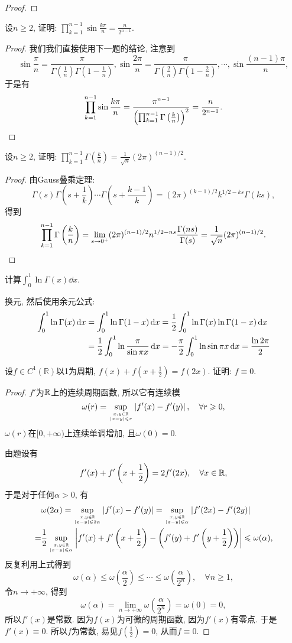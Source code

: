 \begin{quiza}
\begin{proof}
\end{proof}
\woe 设\(n\geqslant 2\), 证明: \(\prod_{k=1}^{n-1}\sin\frac{k\pi}{n}=\frac{n}{2^{n-1}}\).
\begin{proof}
我们我们直接使用下一题的结论, 注意到\[\sin\frac{\pi}{n}=\frac{\pi}{\Gamma\left(\frac{1}{n}\right)\Gamma\left(1-\frac{1}{n}\right)},\sin\frac{2\pi}{n}=\frac{\pi}{\Gamma\left(\frac{2}{n}\right)\Gamma\left(1-\frac{2}{n}\right)},\cdots,\sin\frac{(n-1)\pi}{n},\]于是有\[\prod_{k=1}^{n-1}\sin\frac{k\pi}{n}=\frac{\pi^{n-1}}{\left(\prod_{k=1}^{n-1}\Gamma\left(\frac{k}{n}\right)\right)^2}=\frac{n}{2^{n-1}}.\qedhere\]
\end{proof}
\woe 设\(n\geqslant 2\), 证明: \(\prod_{k=1}^{n-1}\Gamma\left(\frac{k}{n}\right)=\frac{1}{\sqrt{n}}(2\pi)^{(n-1)/2}.\)
\begin{proof}
由Gauss叠乘定理: \[\Gamma(s)\Gamma\left(s+\frac{1}{k}\right)\cdots\Gamma\left(s+\frac{k-1}{k}\right)=\left(2\pi\right)^{(k-1)/2}k^{1/2-ks}\Gamma(ks),\]得到\[\prod_{k=1}^{n-1}\Gamma\left(\frac{k}{n}\right)=\lim_{s\rightarrow 0^+}(2\pi)^{(n-1)/2}n^{1/2-ns}\frac{\Gamma(ns)}{\Gamma(s)}=\frac{1}{\sqrt{n}}(2\pi)^{(n-1)/2}.\qedhere\]
\end{proof}
\woe 计算\(\int_{0}^{1}\ln\Gamma(x)\dd x.\)
\begin{solution}
换元, 然后使用余元公式:\[\begin{split}
\int_{0}^{1}\ln\Gamma(x)\,\mathrm{d} x&=\int_{0}^{1}\ln\Gamma(1-x)\,\mathrm{d} x=\frac{1}{2}\int_{0}^{1}\ln\Gamma(x)\ln\Gamma(1-x)\,\mathrm{d} x\\&=\frac{1}{2}\int_{0}^{1}\ln\frac{\pi}{\sin\pi x}\,\mathrm{d} x=-\frac{\pi}{2}\int_{0}^{1}\ln\sin\pi x\,\mathrm{d} x=\frac{\ln2\pi}{2}\qedhere
\end{split}\]
\end{solution}
\woe 设\(f\in C^1(\mathbb{R})\)以1为周期, \(f(x)+f\left(x+\frac{1}{2}\right)=f(2x)\). 证明: \(f\equiv 0\).
\begin{proof}
\(f'\)为\(\mathbb{R}\)上的连续周期函数, 所以它有连续模\[\omega(r)=\sup_{x,y\in\mathbb{R} \atop |x-y|\leqslant r}\left|f'(x)-f'(y)\right|,\quad \forall r\geqslant 0,\]\(\omega(r)\)在\([0,+\infty)\)上连续单调增加, 且\(\omega(0)=0\).

由题设有\[f'(x)+f'\left(x+\frac{1}{2}\right)=2f'(2x),\quad\forall x\in\mathbb{R},\]于是对于任何\(\alpha>0\), 有\[\begin{split}
&\omega(2\alpha)=\sup_{x,y\in\mathbb{R} \atop |x-y|\leqslant 2\alpha}\left|f'(x)-f'(y)\right|=\sup_{x,y\in\mathbb{R} \atop |x-y|\leqslant\alpha}\left|f'(2x)-f'(2y)\right|\\=&\frac{1}{2}\sup_{x,y\in\mathbb{R} \atop |x-y|\leqslant \alpha}\left|f'(x)+f'\left(x+\frac{1}{2}\right)-\left(f'(y)+f'\left(y+\frac{1}{2}\right)\right)\right|\leqslant\omega(\alpha),
\end{split}\]反复利用上式得到\[\omega(\alpha)\leqslant\omega\left(\frac{\alpha}{2}\right)\leqslant\cdots\leqslant\omega\left(\frac{\alpha}{2^n}\right),\quad\forall n\geqslant 1,\]令\(n\rightarrow+\infty\), 得到\[\omega(\alpha)=\lim_{n\rightarrow+\infty}\omega\left(\frac{\alpha}{2^n}\right)=\omega(0)=0,\]所以\(f'(x)\)是常数. 因为\(f(x)\)为可微的周期函数, 因为\(f'(x)\)有零点. 于是\(f'(x)\equiv 0\). 所以\(f\)为常数, 易见\(f\left(\frac{1}{2}\right)=0\), 从而\(f\equiv 0\).
\end{proof}
\end{quiza}
